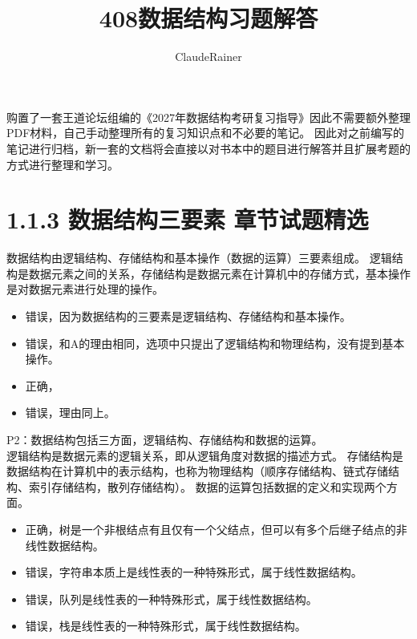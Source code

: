 \documentclass[b5paper,11pt]{article}
\title{408数据结构习题解答}
\author{ClaudeRainer}
\date{}
\begin{document}
\maketitle

\begin{cquote}
  购置了一套王道论坛组编的《2027年数据结构考研复习指导》因此不需要额外整理PDF材料，自己手动整理所有的复习知识点和不必要的笔记。
  因此对之前编写的笔记进行归档，新一套的文档将会直接以对书本中的题目进行解答并且扩展考题的方式进行整理和学习。
\end{cquote}

\section{1.1.3 数据结构三要素 \space 章节试题精选}
数据结构由逻辑结构、存储结构和基本操作（数据的运算）三要素组成。
逻辑结构是数据元素之间的关系，存储结构是数据元素在计算机中的存储方式，基本操作是对数据元素进行处理的操作。

\begin{itemize}
  \item[A] 错误，因为数据结构的三要素是逻辑结构、存储结构和基本操作。
  \item[B] 错误，和A的理由相同，选项中只提出了逻辑结构和物理结构，没有提到基本操作。
  \item[C] 正确，
  \item[D] 错误，理由同上。
\end{itemize}

\begin{solution}
  P2：数据结构包括三方面，逻辑结构、存储结构和数据的运算。 \\
  逻辑结构是数据元素的逻辑关系，即从逻辑角度对数据的描述方式。
  存储结构是数据结构在计算机中的表示结构，也称为物理结构（顺序存储结构、链式存储结构、索引存储结构，散列存储结构）。
  数据的运算包括数据的定义和实现两个方面。
\end{solution}

\begin{itemize}
  \item[A] 正确，树是一个非根结点有且仅有一个父结点，但可以有多个后继子结点的非线性数据结构。
  \item[B] 错误，字符串本质上是线性表的一种特殊形式，属于线性数据结构。
  \item[C] 错误，队列是线性表的一种特殊形式，属于线性数据结构。
  \item[D] 错误，栈是线性表的一种特殊形式，属于线性数据结构。
\end{itemize}
\end{document}
